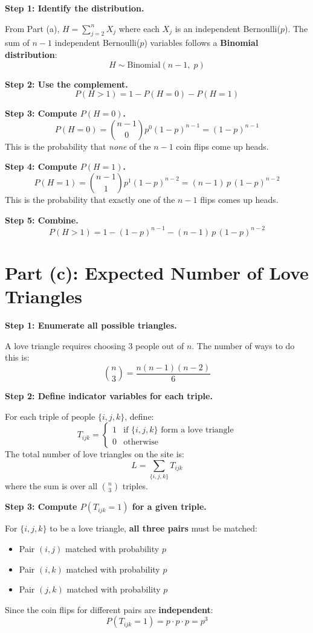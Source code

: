 \documentclass[11pt]{article}
\begin{document}
\textbf{Step 1: Identify the distribution.}

From Part (a), $H = \sum_{j=2}^{n} X_j$ where each $X_j$ is an independent Bernoulli($p$). The sum of $n-1$ independent Bernoulli($p$) variables follows a \textbf{Binomial distribution}:
\[
H \sim \text{Binomial}(n-1,\; p)
\]

\textbf{Step 2: Use the complement.}
\[
P(H > 1) = 1 - P(H = 0) - P(H = 1)
\]

\textbf{Step 3: Compute $P(H = 0)$.}
\[
P(H = 0) = \binom{n-1}{0} p^0 (1-p)^{n-1} = (1-p)^{n-1}
\]
This is the probability that \emph{none} of the $n-1$ coin flips come up heads.

\textbf{Step 4: Compute $P(H = 1)$.}
\[
P(H = 1) = \binom{n-1}{1} p^1 (1-p)^{n-2} = (n-1)\,p\,(1-p)^{n-2}
\]
This is the probability that exactly one of the $n-1$ flips comes up heads.

\textbf{Step 5: Combine.}
\[
P(H > 1) = 1 - (1-p)^{n-1} - (n-1)\,p\,(1-p)^{n-2}
\]

\begin{center}
\end{center}

\section*{Part (c): Expected Number of Love Triangles}

\textbf{Step 1: Enumerate all possible triangles.}

A love triangle requires choosing 3 people out of $n$. The number of ways to do this is:
\[
\binom{n}{3} = \frac{n(n-1)(n-2)}{6}
\]

\textbf{Step 2: Define indicator variables for each triple.}

For each triple of people $\{i, j, k\}$, define:
\[
T_{ijk} = \begin{cases} 1 & \text{if } \{i, j, k\} \text{ form a love triangle} \\ 0 & \text{otherwise} \end{cases}
\]
The total number of love triangles on the site is:
\[
L = \sum_{\{i,j,k\}} T_{ijk}
\]
where the sum is over all $\binom{n}{3}$ triples.

\textbf{Step 3: Compute $P(T_{ijk} = 1)$ for a given triple.}

For $\{i, j, k\}$ to be a love triangle, \textbf{all three pairs} must be matched:
\begin{itemize}[nosep]
    \item Pair $(i,j)$ matched with probability $p$
    \item Pair $(i,k)$ matched with probability $p$
    \item Pair $(j,k)$ matched with probability $p$
\end{itemize}
Since the coin flips for different pairs are \textbf{independent}:
\[
P(T_{ijk} = 1) = p \cdot p \cdot p = p^3
\]
\end{document}
